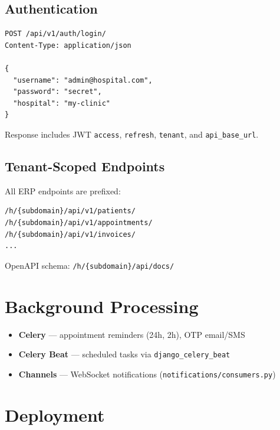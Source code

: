 \documentclass[11pt,a4paper]{report}
\begin{document}
\section{Authentication}

\begin{lstlisting}[style=code]
POST /api/v1/auth/login/
Content-Type: application/json

{
  "username": "admin@hospital.com",
  "password": "secret",
  "hospital": "my-clinic"
}
\end{lstlisting}

Response includes JWT \texttt{access}, \texttt{refresh}, \texttt{tenant}, and \texttt{api\_base\_url}.

\section{Tenant-Scoped Endpoints}

All ERP endpoints are prefixed:
\begin{lstlisting}[style=code]
/h/{subdomain}/api/v1/patients/
/h/{subdomain}/api/v1/appointments/
/h/{subdomain}/api/v1/invoices/
...
\end{lstlisting}

OpenAPI schema: \texttt{/h/\{subdomain\}/api/docs/}

\chapter{Background Processing}

\begin{itemize}[noitemsep]
    \item \textbf{Celery} --- appointment reminders (24h, 2h), OTP email/SMS
    \item \textbf{Celery Beat} --- scheduled tasks via \texttt{django\_celery\_beat}
    \item \textbf{Channels} --- WebSocket notifications (\texttt{notifications/consumers.py})
\end{itemize}

\chapter{Deployment}
\end{document}
